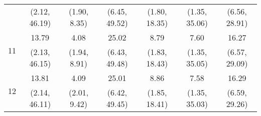 \documentclass{article}
\begin{document}
\begin{table}
\begin{tabular}{ccccccc}
		 & (2.12, 46.19) & (1.90, 8.35) & (6.45, 49.52) & (1.80, 18.35) & (1.35, 35.06) & (6.56, 28.91)\\
		\multirow{2}{*}{11} & 13.79 & 4.08 & 25.02 & 8.79 & 7.60 & 16.27\\
		 & (2.13, 46.15) & (1.94, 8.91) & (6.43, 49.48) & (1.83, 18.43) & (1.35, 35.05) & (6.57, 29.09)\\
		\multirow{2}{*}{12} & 13.81 & 4.09 & 25.01 & 8.86 & 7.58 & 16.29\\
		 & (2.14, 46.11) & (2.01, 9.42) & (6.42, 49.45) & (1.85, 18.41) & (1.35, 35.03) & (6.59, 29.26)\\
	\end{tabular}
\label{tab:fevd-Model_PERR_Q_govexp-neerQoq}
\end{table}
\end{document}
